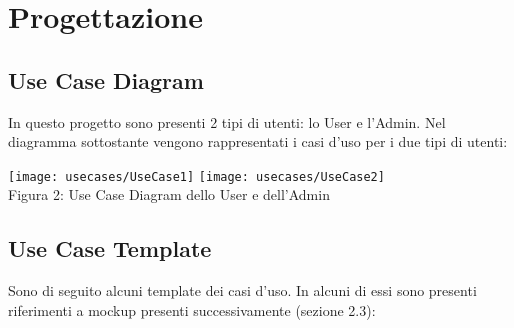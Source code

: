 \documentclass[10pt]{article}
\begin{document}
\section{Progettazione}
\subsection{Use Case Diagram}

In questo progetto sono presenti 2 tipi di utenti: lo User e l'Admin. Nel diagramma sottostante vengono rappresentati i casi d'uso per i due tipi di utenti: 

\begin{center}
\texttt{[image: usecases/UseCase1]}
\texttt{[image: usecases/UseCase2]}\\
Figura 2: Use Case Diagram dello User e dell'Admin
\end{center}

\subsection{Use Case Template}
Sono di seguito alcuni template dei casi d'uso. In alcuni di essi sono presenti riferimenti a mockup presenti successivamente (sezione 2.3):
\end{document}
